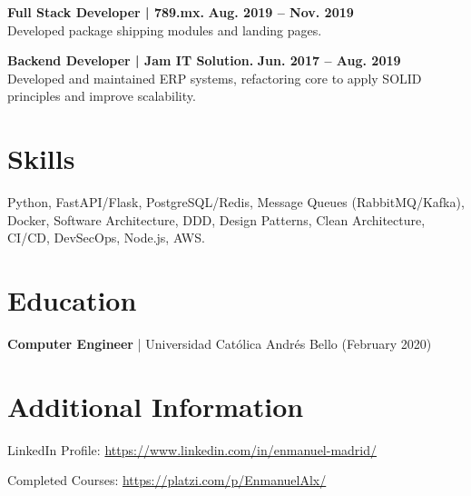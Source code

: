 \documentclass[11pt,a4paper]{article}
\begin{document}
\vspace{0.3cm}

\noindent
\textbf{\color{black} Full Stack Developer | 789.mx.} \hfill \textbf{\color{black} Aug. 2019 -- Nov. 2019} \\
Developed package shipping modules and landing pages.

\vspace{0.3cm}

\noindent
\textbf{\color{black} Backend Developer | Jam IT Solution.} \hfill \textbf{\color{black} Jun. 2017 -- Aug. 2019} \\
Developed and maintained ERP systems, refactoring core to apply SOLID principles and improve scalability.

\vspace{0.3cm}

\section*{Skills}
Python, FastAPI/Flask, PostgreSQL/Redis, Message Queues (RabbitMQ/Kafka), Docker, Software Architecture, DDD, Design Patterns, Clean Architecture, CI/CD, DevSecOps, Node.js, AWS.

\vspace{0.3cm}

\section*{Education}
\textbf{Computer Engineer} | Universidad Católica Andrés Bello (February 2020)

\vspace{0.3cm}

\section*{Additional Information}
LinkedIn Profile: \href{https://www.linkedin.com/in/enmanuel-madrid/}{https://www.linkedin.com/in/enmanuel-madrid/}

Completed Courses: \href{https://platzi.com/p/EnmanuelAlx/}{https://platzi.com/p/EnmanuelAlx/}
\end{document}
